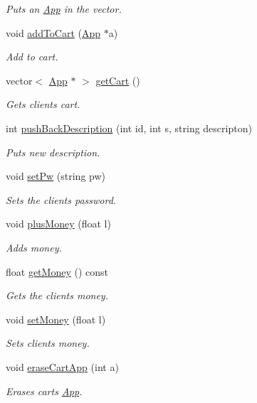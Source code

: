\begin{DoxyCompactItemize}
\begin{DoxyCompactList}\small\item\em Puts an \hyperlink{class_app}{App} in the vector. \end{DoxyCompactList}\item 
void \hyperlink{class_client_ac3956ed4b2cc35e3be84ee2e89008108}{add\-To\-Cart} (\hyperlink{class_app}{App} $\ast$a)
\begin{DoxyCompactList}\small\item\em Add to cart. \end{DoxyCompactList}\item 
vector$<$ \hyperlink{class_app}{App} $\ast$ $>$ \hyperlink{class_client_a6f451827c4a1ad44bd80655456fc7b83}{get\-Cart} ()
\begin{DoxyCompactList}\small\item\em Gets clients cart. \end{DoxyCompactList}\item 
int \hyperlink{class_client_aeb4bceecc6d4be3fd53db4d490a0843e}{push\-Back\-Description} (int id, int s, string descripton)
\begin{DoxyCompactList}\small\item\em Puts new description. \end{DoxyCompactList}\item 
void \hyperlink{class_client_ab772fe1ebe3f9782ea8cca34be0adc21}{set\-Pw} (string pw)
\begin{DoxyCompactList}\small\item\em Sets the clients password. \end{DoxyCompactList}\item 
void \hyperlink{class_client_a2538e13b0ef01ecb00a362bb80fdeded}{plus\-Money} (float l)
\begin{DoxyCompactList}\small\item\em Adds money. \end{DoxyCompactList}\item 
float \hyperlink{class_client_ab7273217432f9906a7fd8c50637c6187}{get\-Money} () const 
\begin{DoxyCompactList}\small\item\em Gets the clients money. \end{DoxyCompactList}\item 
void \hyperlink{class_client_a5849a7c952a95fa7d7c941efe4068ade}{set\-Money} (float l)
\begin{DoxyCompactList}\small\item\em Sets clients money. \end{DoxyCompactList}\item 
void \hyperlink{class_client_a9a90dc954556b3f1062900e5df03a201}{erase\-Cart\-App} (int a)
\begin{DoxyCompactList}\small\item\em Erases carts \hyperlink{class_app}{App}. \end{DoxyCompactList}\end{DoxyCompactItemize}
